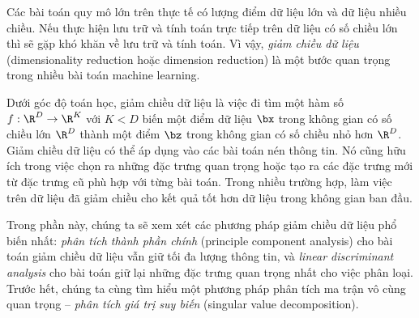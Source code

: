 Các bài toán quy mô lớn trên thực tế có lượng điểm dữ liệu lớn và dữ liệu nhiều
chiều. Nếu thực hiện lưu trữ và tính toán trực tiếp trên dữ liệu có số chiều lớn
thì sẽ gặp khó khăn về lưu trữ và tính toán. Vì vậy, \textit{giảm
chiều dữ liệu} ({dimensionality reduction} hoặc {dimension reduction}) là một
bước quan trọng trong nhiều bài toán machine learning.


Dưới góc độ toán học, giảm chiều dữ liệu là việc đi tìm một hàm số $f: \R^D
\rightarrow \R^K$ với $K < D$ biến một điểm dữ liệu $\bx$ trong không gian có số
chiều lớn $\R^D$ thành một điểm $\bz$ trong không gian có số chiều nhỏ hơn
$\R^D$. Giảm chiều dữ liệu có thể áp dụng vào các bài toán nén thông tin. Nó cũng hữu ích trong việc chọn ra những đặc trưng quan trọng hoặc
tạo ra các đặc trưng mới từ đặc trưng cũ phù hợp với từng bài toán. Trong nhiều trường hợp, làm việc trên dữ liệu đã giảm chiều cho kết quả tốt
hơn dữ liệu trong không gian ban đầu. 

Trong phần này, chúng ta sẽ xem xét các phương pháp giảm chiều dữ liệu phổ biến
nhất: \textit{phân tích thành phần chính} ({principle component analysis}) cho bài toán giảm chiều dữ liệu
vẫn giữ tối đa lượng thông tin, và \textit{linear discriminant analysis}
cho bài toán giữ lại những đặc trưng quan trọng nhất cho việc phân loại. Trước
hết, chúng ta cùng tìm hiểu một phương pháp phân tích ma trận vô
cùng quan trọng  --  \textit{phân tích giá trị suy biến} ({singular value decomposition}). 